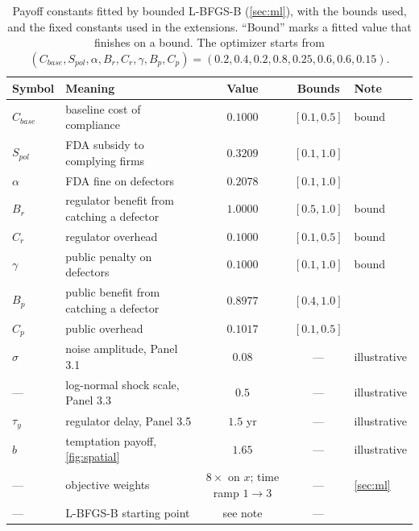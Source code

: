 \documentclass[10pt]{article}
\begin{document}
\begin{appendices}
\begin{table}
\centering
\caption{Payoff constants fitted by bounded L-BFGS-B (\cref{sec:ml}), with the bounds used, and the fixed constants used in the extensions. ``Bound'' marks a fitted value that finishes on a bound. The optimizer starts from $(C_{base},S_{pol},\alpha,B_r,C_r,\gamma,B_p,C_p)=(0.2,0.4,0.2,0.8,0.25,0.6,0.6,0.15)$.}\label{tab:params}
{\small
\begin{tabular}{@{}llccl@{}}
\toprule
Symbol & Meaning & Value & Bounds & Note \\
\midrule
$C_{base}$ & baseline cost of compliance & $0.1000$ & $[0.1,0.5]$ & bound \\
$S_{pol}$ & FDA subsidy to complying firms & $0.3209$ & $[0.1,1.0]$ & \\
$\alpha$ & FDA fine on defectors & $0.2078$ & $[0.1,1.0]$ & \\
$B_r$ & regulator benefit from catching a defector & $1.0000$ & $[0.5,1.0]$ & bound \\
$C_r$ & regulator overhead & $0.1000$ & $[0.1,0.5]$ & bound \\
$\gamma$ & public penalty on defectors & $0.1000$ & $[0.1,1.0]$ & bound \\
$B_p$ & public benefit from catching a defector & $0.8977$ & $[0.4,1.0]$ & \\
$C_p$ & public overhead & $0.1017$ & $[0.1,0.5]$ & \\
\midrule
$\sigma$ & noise amplitude, Panel 3.1 & $0.08$ & --- & illustrative \\
--- & log-normal shock scale, Panel 3.3 & $0.5$ & --- & illustrative \\
$\tau_y$ & regulator delay, Panel 3.5 & $1.5$ yr & --- & illustrative \\
$b$ & temptation payoff, \cref{fig:spatial} & $1.65$ & --- & illustrative \\
--- & objective weights & $8\times$ on $x$; time ramp $1\to3$ & --- & \cref{sec:ml} \\
--- & L-BFGS-B starting point & see note & --- & \\
\bottomrule
\end{tabular}}
\end{table}


\end{appendices}
\end{document}
